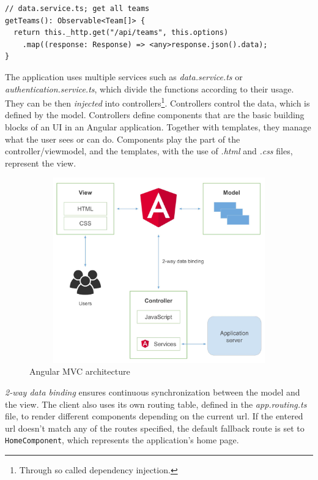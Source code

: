 \begin{verbatim}
// data.service.ts; get all teams
getTeams(): Observable<Team[]> {
  return this._http.get("/api/teams", this.options)
    .map((response: Response) => <any>response.json().data); 
}
\end{verbatim}


The application uses multiple services such as \textit{data.service.ts} or \textit{authentication.service.ts}, which divide the functions according to their usage. They can be then \textit{injected} into controllers\footnote{Through so called dependency injection.}. Controllers control the data, which is defined by the model. Controllers define components that are the basic building blocks of an UI in an Angular application. Together with templates, they manage what the user sees or can do. Components play the part of the controller/viewmodel, and the templates, with the use of \textit{.html} and \textit{.css} files, represent the view.

\begin{figure}[htb]
\begin{center}
  \includegraphics*[width=14cm,height=8cm,keepaspectratio]{images/angular_mvc}
\end{center}
\caption{Angular MVC architecture}
\label{img:angular}
\end{figure}

\textit{2-way data binding} ensures continuous synchronization between the model and the view. The client also uses its own routing table, defined in the \textit{app.routing.ts} file, to render different components depending on the current url. If the entered url doesn’t match any of the routes specified, the default fallback route is set to \texttt{HomeComponent}, which represents the application’s home page.


